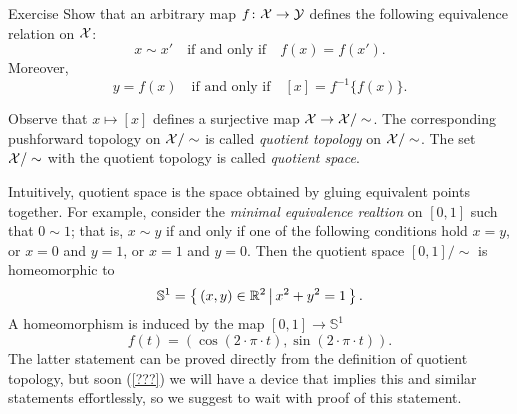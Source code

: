 \begin{thm}{Exercise}
Show that an arbitrary map $f\colon\mathcal{X}\to \mathcal{Y}$ defines the following equivalence relation on $\mathcal{X}$:
\[x\sim x'\quad\text{if and only if}\quad f(x)=f(x').\]
Moreover,
\[y=f(x)\quad\text{if and only if}\quad [x]=f^{-1}\{f(x)\}.\]
\end{thm}

Observe that $x\mapsto [x]$ defines a surjective map $\mathcal{X}\to \mathcal{X}/\sim$.
The corresponding pushforward topology on $\mathcal{X}/\sim$ is called \emph{quotient topology} on $\mathcal{X}/\sim$.
The set $\mathcal{X}/\sim$ with the quotient topology is called \emph{quotient space}.

Intuitively, quotient space is the space obtained by gluing equivalent points together.
For example, consider the \emph{minimal equivalence realtion} on $[0,1]$ such that $0\sim 1$;
that is, $x\sim y$ if and only if one of the following conditions hold $x=y$, or $x=0$ and $y=1$, or $x=1$ and $y=0$.
Then the quotient space $[0,1]/\sim$ is homeomorphic to 
\[\mathbb{S}^1=\left\{\,{(x,y)\in\mathbb{R}^2}\,\middle|\,{x^2+y^2=1}\,\right\}.\]
A homeomorphism is induced by the map $[0,1]\to \mathbb{S}^1$
\[f(t)=\left(\cos(2\cdot\pi\cdot t),\sin(2\cdot\pi\cdot t)\right).\]
The latter statement can be proved directly from the definition of quotient topology, but soon (\ref{???}) we will have a device that implies this and similar statements effortlessly, so we suggest to wait with proof of this statement.
